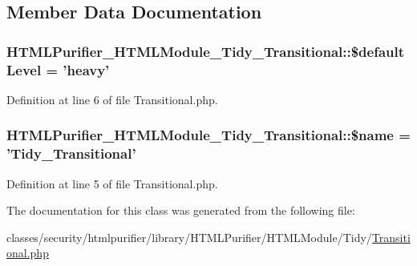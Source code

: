 \subsection{Member Data Documentation}
\hypertarget{classHTMLPurifier__HTMLModule__Tidy__Transitional_a510405d2fc5b924b1360306210a1e768}{
\subsubsection[{\$default\+Level}]{\setlength{\rightskip}{0pt plus 5cm}H\+T\+M\+L\+Purifier\+\_\+\+H\+T\+M\+L\+Module\+\_\+\+Tidy\+\_\+\+Transitional\+::\$default\+Level = 'heavy'}}\label{classHTMLPurifier__HTMLModule__Tidy__Transitional_a510405d2fc5b924b1360306210a1e768}


Definition at line 6 of file Transitional.\+php.

\hypertarget{classHTMLPurifier__HTMLModule__Tidy__Transitional_ad0ff9fac768c3cf2ec88f7d8828a774a}{
\subsubsection[{\$name}]{\setlength{\rightskip}{0pt plus 5cm}H\+T\+M\+L\+Purifier\+\_\+\+H\+T\+M\+L\+Module\+\_\+\+Tidy\+\_\+\+Transitional\+::\$name = 'Tidy\+\_\+\+Transitional'}}\label{classHTMLPurifier__HTMLModule__Tidy__Transitional_ad0ff9fac768c3cf2ec88f7d8828a774a}


Definition at line 5 of file Transitional.\+php.



The documentation for this class was generated from the following file\+:\begin{DoxyCompactItemize}
\item 
classes/security/htmlpurifier/library/\+H\+T\+M\+L\+Purifier/\+H\+T\+M\+L\+Module/\+Tidy/\hyperlink{Transitional_8php}{Transitional.\+php}\end{DoxyCompactItemize}
